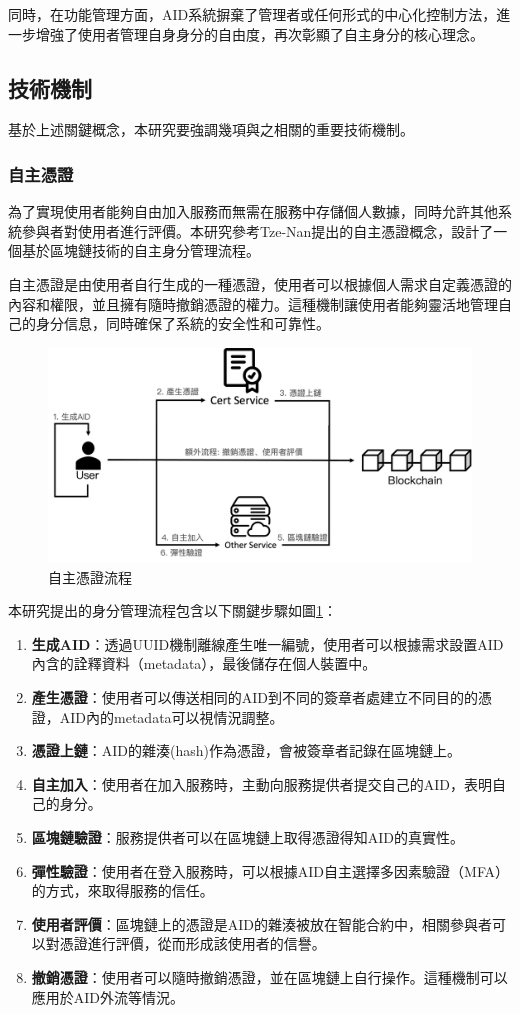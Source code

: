 同時，在功能管理方面，AID系統摒棄了管理者或任何形式的中心化控制方法，進一步增強了使用者管理自身身分的自由度，再次彰顯了自主身分的核心理念。
\subsection{技術機制}
基於上述關鍵概念，本研究要強調幾項與之相關的重要技術機制。
\subsubsection{自主憑證}
為了實現使用者能夠自由加入服務而無需在服務中存儲個人數據，同時允許其他系統參與者對使用者進行評價。本研究參考Tze-Nan\cite{NTU202102846}提出的自主憑證概念，設計了一個基於區塊鏈技術的自主身分管理流程。

自主憑證是由使用者自行生成的一種憑證，使用者可以根據個人需求自定義憑證的內容和權限，並且擁有隨時撤銷憑證的權力。這種機制讓使用者能夠靈活地管理自己的身分信息，同時確保了系統的安全性和可靠性。
\begin{figure}
  \centering
  \includegraphics[width=\linewidth,keepaspectratio]{figures/flow-sc.png}
  \caption{自主憑證流程}
  \label{fig:flow-sc}
\end{figure}
本研究提出的身分管理流程包含以下關鍵步驟如圖\ref{fig:flow-sc}：
\begin{enumerate}
  \item \textbf{生成AID}：透過UUID\cite{uuid}機制離線產生唯一編號，使用者可以根據需求設置AID內含的詮釋資料（metadata），最後儲存在個人裝置中。
  \item \textbf{產生憑證}：使用者可以傳送相同的AID到不同的簽章者處建立不同目的的憑證，AID內的metadata可以視情況調整。
  \item \textbf{憑證上鏈}：AID的雜湊(hash)作為憑證，會被簽章者記錄在區塊鏈上。
  \item \textbf{自主加入}：使用者在加入服務時，主動向服務提供者提交自己的AID，表明自己的身分。
  \item \textbf{區塊鏈驗證}：服務提供者可以在區塊鏈上取得憑證得知AID的真實性。
  \item \textbf{彈性驗證}：使用者在登入服務時，可以根據AID自主選擇多因素驗證（MFA）的方式，來取得服務的信任。
  \item \textbf{使用者評價}：區塊鏈上的憑證是AID的雜湊被放在智能合約中，相關參與者可以對憑證進行評價，從而形成該使用者的信譽。
  \item \textbf{撤銷憑證}：使用者可以隨時撤銷憑證，並在區塊鏈上自行操作。這種機制可以應用於AID外流等情況。
\end{enumerate}
